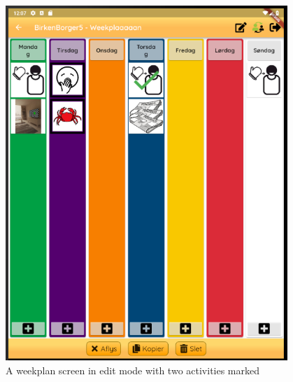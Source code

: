\begin{figure}[H]
    \begin{center}
        \includegraphics[width=0.95\textwidth]{figures/FinalScreen/editWeekplanScreenMarked.png}
    \end{center}
    \caption{A weekplan screen in edit mode with two activities marked}
    \label{fig:finalWeekplanEditMode}
\end{figure}
